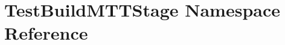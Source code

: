\hypertarget{namespaceTestBuildMTTStage}{\section{Test\-Build\-M\-T\-T\-Stage Namespace Reference}
\label{namespaceTestBuildMTTStage}
}
